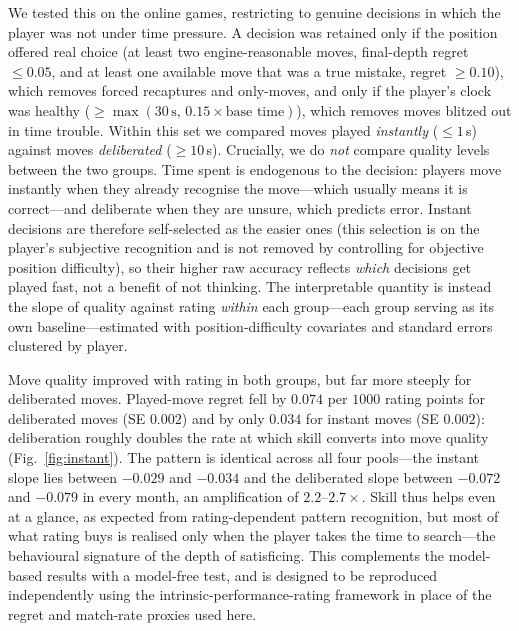 We tested this on the online games, restricting to genuine decisions in which the player was
not under time pressure. A decision was retained only if the position offered real choice
(at least two engine-reasonable moves, final-depth regret ${\le}0.05$, and at least one
available move that was a true mistake, regret ${\ge}0.10$), which removes forced recaptures
and only-moves, and only if the player's clock was healthy
($\ge\max(30\,\text{s},\,0.15\times\text{base time})$), which removes moves blitzed out in
time trouble. Within this set we compared moves played \emph{instantly} (${\le}1$\,s) against
moves \emph{deliberated} (${\ge}10$\,s). Crucially, we do \emph{not} compare quality levels
between the two groups. Time spent is endogenous to the decision: players move instantly when
they already recognise the move---which usually means it is correct---and deliberate when they
are unsure, which predicts error. Instant decisions are therefore self-selected as the easier
ones (this selection is on the player's subjective recognition and is not removed by
controlling for objective position difficulty), so their higher raw accuracy reflects
\emph{which} decisions get played fast, not a benefit of not thinking. The interpretable
quantity is instead the slope of quality against rating \emph{within} each group---each group
serving as its own baseline---estimated with position-difficulty covariates and standard
errors clustered by player.

Move quality improved with rating in both groups, but far more steeply for deliberated moves.
Played-move regret fell by $0.074$ per $1000$ rating points for deliberated moves
(SE $0.002$) and by only $0.034$ for instant moves (SE $0.002$): deliberation roughly doubles
the rate at which skill converts into move quality (Fig.~\ref{fig:instant}). The pattern is
identical across all four pools---the instant slope lies between $-0.029$ and $-0.034$ and the
deliberated slope between $-0.072$ and $-0.079$ in every month, an amplification of
$2.2$--$2.7\times$. Skill thus helps even at a glance, as expected from rating-dependent
pattern recognition, but most of what rating buys is realised only when the player takes the
time to search---the behavioural signature of the depth of satisficing. This complements the
model-based results with a model-free test, and is designed to be reproduced independently
using the intrinsic-performance-rating framework \citep{regan2011,biswas2015} in place of the
regret and match-rate proxies used here.

